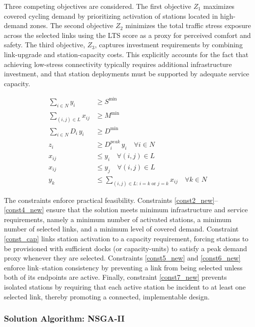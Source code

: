 \documentclass[preprint,authoryear,10pt]{elsarticle}
\begin{document}
Three competing objectives are considered. The first objective $Z_1$ maximizes covered cycling demand by prioritizing activation of stations located in high-demand zones. The second objective $Z_2$ minimizes the total traffic stress exposure across the selected links using the LTS score as a proxy for perceived comfort and safety. The third objective, $Z_3$, captures investment requirements by combining link-upgrade and station-capacity costs. This explicitly accounts for the fact that achieving low-stress connectivity typically requires additional infrastructure investment, and that station deployments must be supported by adequate service capacity.

\begin{align}
\label{const2_new}
\sum_{i\in N} y_i &\ge S^{\min} \\
\label{const3_new}
\sum_{(i,j)\in L} x_{ij} &\ge M^{\min} \\
\label{const4_new}
\sum_{i\in N} D_i\, y_i &\ge D^{\min} \\
\label{const_cap}
z_i &\ge D_i^{peak}\, y_i \quad \forall i \in N \\
\label{const5_new}
x_{ij} &\le y_i \quad \forall (i,j)\in L \\
\label{const6_new}
x_{ij} &\le y_j \quad \forall (i,j)\in L \\
\label{const7_new}
y_k &\le \sum_{(i,j)\in L:\, i=k \text{ or } j=k} x_{ij} \quad \forall k\in N
\end{align}

The constraints enforce practical feasibility. Constraints \eqref{const2_new}--\eqref{const4_new} ensure that the solution meets minimum infrastructure and service requirements, namely a minimum number of activated stations, a minimum number of selected links, and a minimum level of covered demand. Constraint \eqref{const_cap} links station activation to a capacity requirement, forcing stations to be provisioned with sufficient docks (or capacity-units) to satisfy a peak demand proxy whenever they are selected. Constraints \eqref{const5_new} and \eqref{const6_new} enforce link--station consistency by preventing a link from being selected unless both of its endpoints are active. Finally, constraint \eqref{const7_new} prevents isolated stations by requiring that each active station be incident to at least one selected link, thereby promoting a connected, implementable design.

\subsubsection{Solution Algorithm: NSGA-II}\label{subsubsec:nsga2}
\end{document}
